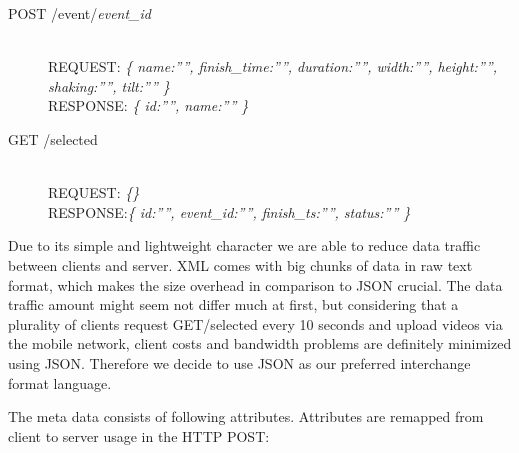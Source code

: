 \documentclass[conference]{IEEEtran}
\begin{document}
\begin{description}
	\item[POST /event/\textit{event\_id}]\hfill\\	
				REQUEST: \textit{\{ name:””, finish\_time:””, duration:””, width:””, height:””, shaking:””, tilt:”” \}}\hfill \\
				RESPONSE: \textit{\{ id:””, name:”” \}}

	\item[GET /selected]\hfill\\		
				REQUEST: \textit{\{\}}\hfill \\
				RESPONSE:\textit{\{ id:””, event\_id:””, finish\_ts:””, status:”” \}}

\end{description}

Due to its simple and lightweight character we are able to reduce data traffic between clients and server. 
XML comes with big chunks of data in raw text format, which makes the size overhead in comparison to JSON crucial.
The data traffic amount might seem not differ much at first, but considering that a plurality of clients request GET/selected every 10 seconds and upload videos via the mobile network, client costs and bandwidth problems are definitely minimized using JSON. Therefore we decide to use JSON as our preferred interchange format language.

The meta data consists of following attributes. Attributes are remapped from client to server usage in the HTTP POST:
\end{document}
